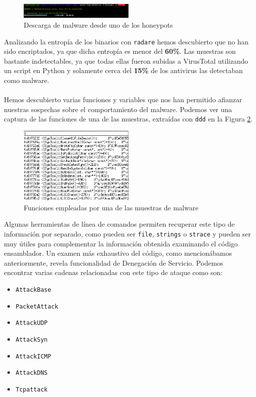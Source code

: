 \documentclass[journal]{IEEEtran}
\begin{document}
\begin{figure}[H]
\centering
\includegraphics[width=0.5\textwidth]{img/download_malware}
\caption{Descarga de malware desde uno de los honeypots}
\label{fig:download_malware}
\end{figure}
Analizando la entropía de los binarios con {\tt radare} hemos descubierto que no han sido encriptados, ya que dicha entropía es menor del \textbf{60\%}. Las muestras son bastante indetectables, ya que todas ellas fueron subidas a VirusTotal utilizando un script en Python y solamente cerca del \textbf{15\%} de los antivirus las detectaban como malware.
\\\\
Hemos descubierto varias funciones y variables que nos han permitido afianzar nuestras sospechas sobre el comportamiento del malware. Podemos ver una captura de las funciones de una de las muestras, extraídas con {\tt ddd} en la Figura \ref{fig:ddd}.
\begin{figure}[H]
\centering
\includegraphics[width=0.5\textwidth]{img/ddd}
\caption{Funciones empleadas por una de las muestras de malware}
\label{fig:ddd}
\end{figure}
Algunas herramientas de línea de comandos permiten recuperar este tipo de información por separado, como pueden ser {\tt file}, {\tt strings} o {\tt strace} y pueden ser muy útiles para complementar la información obtenida examinando el código ensamblador. Un examen más exhaustivo del código, como mencionábamos anteriormente, revela funcionalidad de Denegación de Servicio. Podemos encontrar varias cadenas relacionadas con este tipo de ataque como son:
\begin{itemize}
\item \texttt{AttackBase}
\item \texttt{PacketAttack}
\item \texttt{AttackUDP}
\item \texttt{AttackSyn}
\item \texttt{AttackICMP}
\item \texttt{AttackDNS}
\item \texttt{Tcpattack}
\end{itemize}
\end{document}
